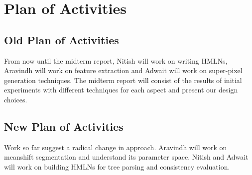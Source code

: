\documentclass{article} %
\begin{document}
\appendix
\section{Plan of Activities}
\label{sec:Plan}
\subsection*{Old Plan of Activities}
From now until the midterm report, Nitish will work on writing HMLNs, Aravindh will work on feature extraction and Adwait will work on super-pixel generation techniques. The midterm report will consist of the results of initial experiments with different techniques for each aspect and present our design choices.
\subsection*{New Plan of Activities}
Work so far suggest a radical change in approach. Aravindh will work on meanshift segmentation and understand its parameter space. Nitish and Adwait will work on building HMLNs for tree parsing and consistency evaluation.
\end{document}
